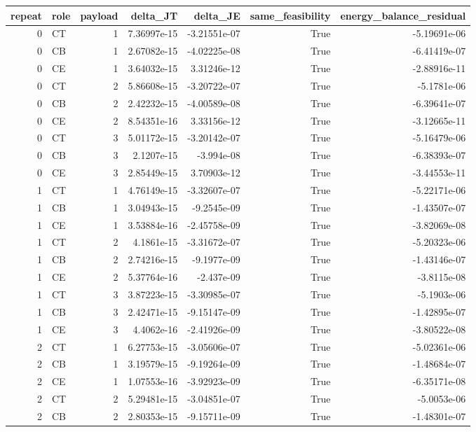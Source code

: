 \begin{tabular}{rlrrrrr}
\toprule
repeat & role & payload & delta\_JT & delta\_JE & same\_feasibility & energy\_balance\_residual \\
\midrule
0 & CT & 1 & 7.36997e-15 & -3.21551e-07 & True & -5.19691e-06 \\
0 & CB & 1 & 2.67082e-15 & -4.02225e-08 & True & -6.41419e-07 \\
0 & CE & 1 & 3.64032e-15 & 3.31246e-12 & True & -2.88916e-11 \\
0 & CT & 2 & 5.86608e-15 & -3.20722e-07 & True & -5.1781e-06 \\
0 & CB & 2 & 2.42232e-15 & -4.00589e-08 & True & -6.39641e-07 \\
0 & CE & 2 & 8.54351e-16 & 3.33156e-12 & True & -3.12665e-11 \\
0 & CT & 3 & 5.01172e-15 & -3.20142e-07 & True & -5.16479e-06 \\
0 & CB & 3 & 2.1207e-15 & -3.994e-08 & True & -6.38393e-07 \\
0 & CE & 3 & 2.85449e-15 & 3.70903e-12 & True & -3.44553e-11 \\
1 & CT & 1 & 4.76149e-15 & -3.32607e-07 & True & -5.22171e-06 \\
1 & CB & 1 & 3.04943e-15 & -9.2545e-09 & True & -1.43507e-07 \\
1 & CE & 1 & 3.53884e-16 & -2.45758e-09 & True & -3.82069e-08 \\
1 & CT & 2 & 4.1861e-15 & -3.31672e-07 & True & -5.20323e-06 \\
1 & CB & 2 & 2.74216e-15 & -9.1977e-09 & True & -1.43146e-07 \\
1 & CE & 2 & 5.37764e-16 & -2.437e-09 & True & -3.8115e-08 \\
1 & CT & 3 & 3.87223e-15 & -3.30985e-07 & True & -5.1903e-06 \\
1 & CB & 3 & 2.42471e-15 & -9.15147e-09 & True & -1.42895e-07 \\
1 & CE & 3 & 4.4062e-16 & -2.41926e-09 & True & -3.80522e-08 \\
2 & CT & 1 & 6.27753e-15 & -3.05606e-07 & True & -5.02361e-06 \\
2 & CB & 1 & 3.19579e-15 & -9.19264e-09 & True & -1.48684e-07 \\
2 & CE & 1 & 1.07553e-16 & -3.92923e-09 & True & -6.35171e-08 \\
2 & CT & 2 & 5.29481e-15 & -3.04851e-07 & True & -5.0053e-06 \\
2 & CB & 2 & 2.80353e-15 & -9.15711e-09 & True & -1.48301e-07 \\

\end{tabular}
